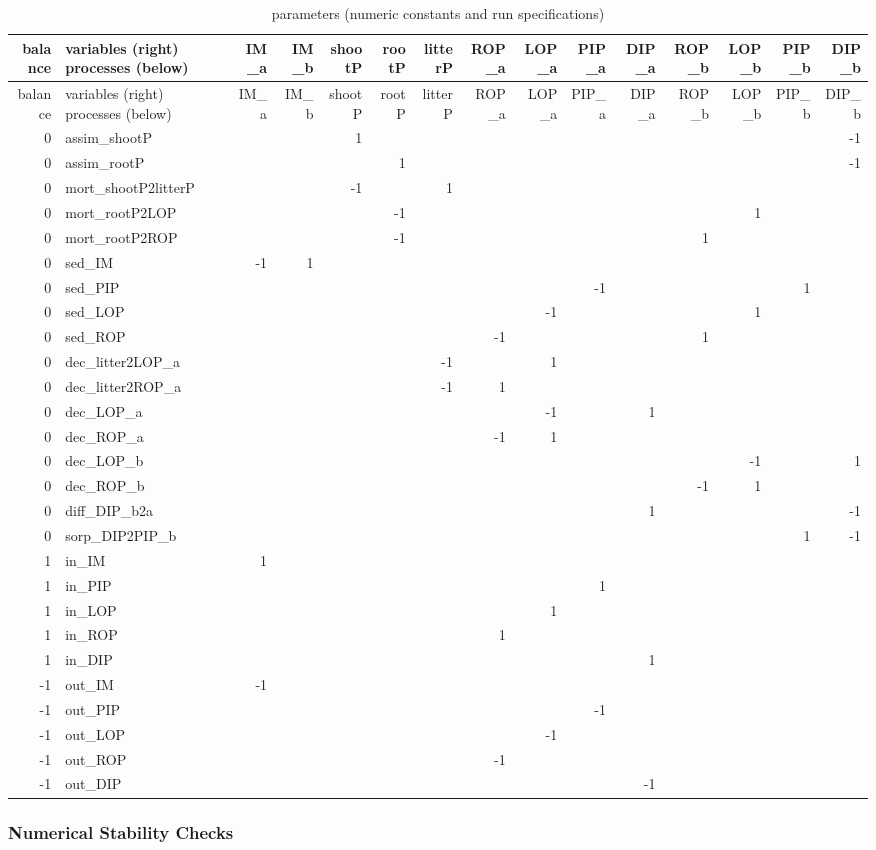\documentclass[
]{article}
\begin{document}
\begin{longtable}[]{@{}rlrrrrrrrrrrrrr@{}}
\caption{parameters (numeric constants and run
specifications)}\tabularnewline
\toprule
balance & variables (right) processes (below) & IM\_a & IM\_b & shootP &
rootP & litterP & ROP\_a & LOP\_a & PIP\_a & DIP\_a & ROP\_b & LOP\_b &
PIP\_b & DIP\_b\tabularnewline
\midrule
\endfirsthead
\toprule
balance & variables (right) processes (below) & IM\_a & IM\_b & shootP &
rootP & litterP & ROP\_a & LOP\_a & PIP\_a & DIP\_a & ROP\_b & LOP\_b &
PIP\_b & DIP\_b\tabularnewline
\midrule
\endhead
0 & assim\_shootP & & & 1 & & & & & & & & & & -1\tabularnewline
0 & assim\_rootP & & & & 1 & & & & & & & & & -1\tabularnewline
0 & mort\_shootP2litterP & & & -1 & & 1 & & & & & & & &\tabularnewline
0 & mort\_rootP2LOP & & & & -1 & & & & & & & 1 & &\tabularnewline
0 & mort\_rootP2ROP & & & & -1 & & & & & & 1 & & &\tabularnewline
0 & sed\_IM & -1 & 1 & & & & & & & & & & &\tabularnewline
0 & sed\_PIP & & & & & & & & -1 & & & & 1 &\tabularnewline
0 & sed\_LOP & & & & & & & -1 & & & & 1 & &\tabularnewline
0 & sed\_ROP & & & & & & -1 & & & & 1 & & &\tabularnewline
0 & dec\_litter2LOP\_a & & & & & -1 & & 1 & & & & & &\tabularnewline
0 & dec\_litter2ROP\_a & & & & & -1 & 1 & & & & & & &\tabularnewline
0 & dec\_LOP\_a & & & & & & & -1 & & 1 & & & &\tabularnewline
0 & dec\_ROP\_a & & & & & & -1 & 1 & & & & & &\tabularnewline
0 & dec\_LOP\_b & & & & & & & & & & & -1 & & 1\tabularnewline
0 & dec\_ROP\_b & & & & & & & & & & -1 & 1 & &\tabularnewline
0 & diff\_DIP\_b2a & & & & & & & & & 1 & & & & -1\tabularnewline
0 & sorp\_DIP2PIP\_b & & & & & & & & & & & & 1 & -1\tabularnewline
1 & in\_IM & 1 & & & & & & & & & & & &\tabularnewline
1 & in\_PIP & & & & & & & & 1 & & & & &\tabularnewline
1 & in\_LOP & & & & & & & 1 & & & & & &\tabularnewline
1 & in\_ROP & & & & & & 1 & & & & & & &\tabularnewline
1 & in\_DIP & & & & & & & & & 1 & & & &\tabularnewline
-1 & out\_IM & -1 & & & & & & & & & & & &\tabularnewline
-1 & out\_PIP & & & & & & & & -1 & & & & &\tabularnewline
-1 & out\_LOP & & & & & & & -1 & & & & & &\tabularnewline
-1 & out\_ROP & & & & & & -1 & & & & & & &\tabularnewline
-1 & out\_DIP & & & & & & & & & -1 & & & &\tabularnewline
\bottomrule
\end{longtable}

\hypertarget{numerical-stability-checks}{%
\subsubsection{Numerical Stability
Checks}\label{numerical-stability-checks}}
\end{document}
